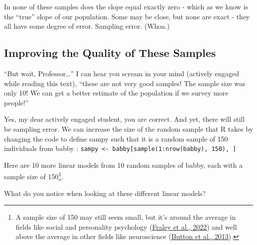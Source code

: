 \documentclass[
  letterpaper,
  DIV=11,
  numbers=noendperiod,
  oneside]{scrreprt}
\begin{document}
In none of these samples does the slope equal exactly zero - which as we
know is the ``true'' slope of our population. Some may be close, but
none are exact - they all have some degree of error. Sampling error.
(Whoa.)\\

\subsection{Improving the Quality of These
Samples}\label{improving-the-quality-of-these-samples}

``But wait, Professor\ldots{}'' I can hear you scream in your mind
(actively engaged while reading this text), ``these are not very good
samples! The sample size was only 10! We can get a better estimate of
the population if we survey more people!''

Yes, my dear actively engaged student, you are correct. And yet, there
will still be sampling error. We can increase the size of the random
sample that R takes by changing the code to define sampy such that it is
a random sample of 150 individuals from babby :
\texttt{sampy\ \textless{}-\ babby{[}sample(1:nrow(babby),\ 150),\ {]}}

Here are 10 more linear models from 10 random samples of babby, each
with a sample size of 150\footnote{A sample size of 150 may still seem
  small, but it's around the average in fields like social and
  personality psychology
  (\href{https://journals.sagepub.com/doi/pdf/10.1177/25152459221120217}{Fraley
  et al., 2022}) and well above the average in other fields like
  neuroscience (\href{https://www.nature.com/articles/nrn3475}{Button et
  al., 2013}).}.~

What do you notice when looking at these different linear models?
\end{document}
